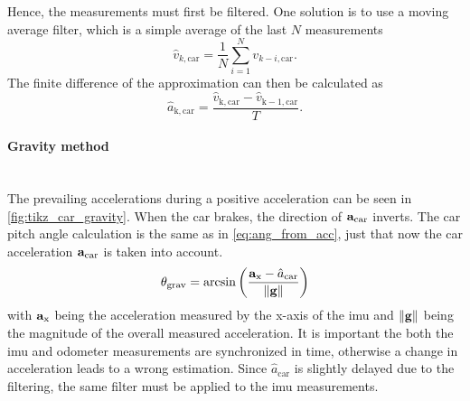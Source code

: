Hence, the measurements must first be filtered.
One solution is to use a moving average filter, which is a simple average of the last $N$ measurements
\begin{equation}
	\hat{v}_{k, \mathrm{car}} = \frac{1}{N}\sum_{i=1}^N v_{k - i, \mathrm{car}}.
\end{equation}
The finite difference of the approximation can then be calculated as
\begin{equation}
	\label{eq:v_car_diff}
	\hat{a}_\mathrm{k, car} = \frac{\hat{v}_\mathrm{k, car} - \hat{v}_\mathrm{k - 1, car}}{T}.
\end{equation}

\paragraph{Gravity method}\mbox{}\\
The prevailing accelerations during a positive acceleration can be seen in \cref{fig:tikz_car_gravity}.
When the car brakes, the direction of $\vb{a}_\mathrm{car}$ inverts.
The car pitch angle calculation is the same as in \cref{eq:ang_from_acc}, just that now the car acceleration $\vb{a}_\mathrm{car}$ is taken into account.
\begin{equation}
	\label{eq:ang_from_acc_gravity}
	\theta_\mathrm{grav}  = \arcsin\left(\frac{\vb{a}_\mathrm{x} - \hat{a}_\mathrm{car}}{\norm{\vb{g}}}\right)
\end{equation}
with $\vb{a}_\mathrm{x}$ being the acceleration measured by the x-axis of the \gls{imu} and $\norm{\vb{g}}$ being the magnitude of the overall measured acceleration.
It is important the both the \gls{imu} and odometer measurements are synchronized in time, otherwise a change in acceleration leads to a wrong estimation.
Since $\hat{a}_\mathrm{car}$ is slightly delayed due to the filtering, the same filter must be applied to the \gls{imu} measurements.


